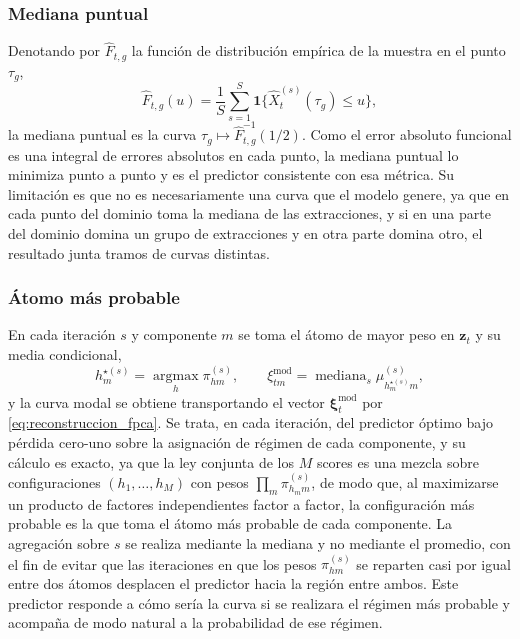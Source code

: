 \subsubsection{Mediana puntual}
\label{03_05_04_01_mediana_puntual}

Denotando por $\widehat{F}_{t,g}$ la función de distribución empírica de la muestra en el punto $\tau_g$,
\begin{equation}\label{eq:fdist_empirica}
    \widehat{F}_{t,g}(u) = \frac{1}{S}\sum_{s=1}^{S}
    \mathbf{1}\bigl\{\widehat{X}_{t}^{(s)}(\tau_g) \leq u\bigr\},
\end{equation}
la mediana puntual es la curva $\tau_g \mapsto \widehat{F}_{t,g}^{-1}(1/2)$. Como el error absoluto funcional es una integral de errores absolutos en cada punto, la mediana puntual lo minimiza punto a punto y es el predictor consistente con esa métrica. Su limitación es que no es necesariamente una curva que el modelo genere, ya que en cada punto del dominio toma la mediana de las extracciones, y si en una parte del dominio domina un grupo de extracciones y en otra parte domina otro, el resultado junta tramos de curvas distintas. 

\subsubsection{Átomo más probable}
\label{03_05_04_02_atomo_modal}
 En cada iteración $s$ y componente $m$ se toma el átomo de mayor peso en $\mathbf{z}_t$ y su media condicional,
\begin{equation}\label{eq:atomo_modal}
    h_m^{\star(s)} = \operatorname*{argmax}_{h} \pi_{hm}^{(s)},
    \qquad
    \xi_{tm}^{\mathrm{mod}} = \operatorname{mediana}_{s}\mu_{h_m^{\star(s)} m}^{(s)},
\end{equation}
y la curva modal se obtiene transportando el vector $\boldsymbol{\xi}_t^{\mathrm{mod}}$ por \eqref{eq:reconstruccion_fpca}. Se trata, en cada iteración, del predictor óptimo bajo pérdida cero-uno sobre la asignación de régimen de cada componente, y su cálculo es exacto, ya que la ley conjunta de los $M$ scores es una mezcla sobre configuraciones $(h_1, \dots, h_M)$ con pesos $\prod_m \pi_{h_m m}^{(s)}$, de modo que, al maximizarse un producto de factores independientes factor a factor, la configuración más probable es la que toma el átomo más probable de cada componente. La agregación sobre $s$ se realiza mediante la mediana y no mediante el promedio, con el fin de evitar que las iteraciones en que los pesos $\pi_{hm}^{(s)}$ se reparten casi por igual entre dos átomos desplacen el predictor hacia la región entre ambos. Este predictor responde a cómo sería la curva si se realizara el régimen más probable y acompaña de modo natural a la probabilidad de ese régimen.\\

